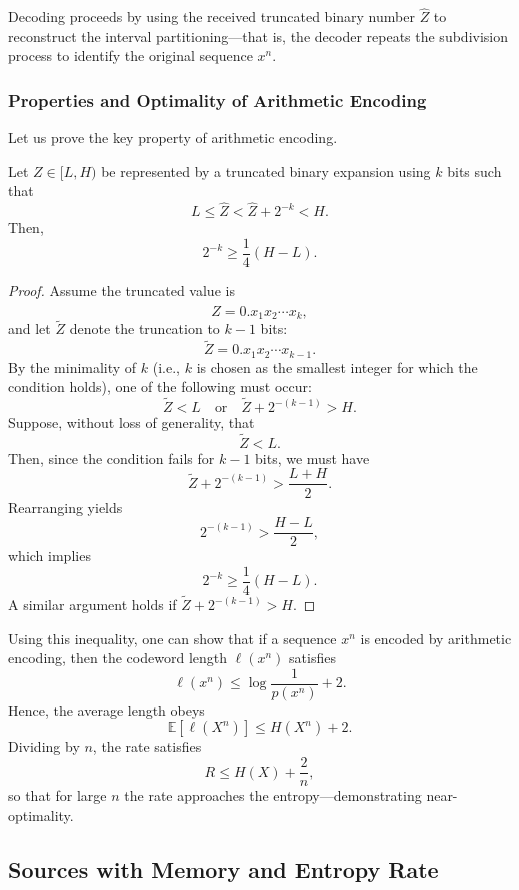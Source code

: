 Decoding proceeds by using the received truncated binary number \(\hat{Z}\) to reconstruct the interval partitioning—that is, the decoder repeats the subdivision process to identify the original sequence \(x^n\).

\subsubsection*{Properties and Optimality of Arithmetic Encoding}
Let us prove the key property of arithmetic encoding.

\begin{theorem}
Let \(Z \in [L,H)\) be represented by a truncated binary expansion using \(k\) bits such that
\[
L \le \hat{Z} < \hat{Z} + 2^{-k} < H.
\]
Then,
\[
2^{-k} \ge \frac{1}{4}(H-L).
\]
\end{theorem}
\begin{proof}
Assume the truncated value is 
\[
\hat{Z} = 0.x_1x_2\cdots x_k,
\]
and let \(\tilde{Z}\) denote the truncation to \(k-1\) bits:
\[
\tilde{Z} = 0.x_1x_2\cdots x_{k-1}.
\]
By the minimality of \(k\) (i.e., \(k\) is chosen as the smallest integer for which the condition holds), one of the following must occur:
\[
\tilde{Z} < L \quad \text{or} \quad \tilde{Z} + 2^{-(k-1)} > H.
\]
Suppose, without loss of generality, that
\[
\tilde{Z} < L.
\]
Then, since the condition fails for \(k-1\) bits, we must have 
\[
\tilde{Z} + 2^{-(k-1)} > \frac{L+H}{2}.
\]
Rearranging yields
\[
2^{-(k-1)} > \frac{H-L}{2},
\]
which implies
\[
2^{-k} \ge \frac{1}{4}(H-L).
\]
A similar argument holds if \(\tilde{Z} + 2^{-(k-1)} > H\).
\end{proof}

Using this inequality, one can show that if a sequence \(x^n\) is encoded by arithmetic encoding, then the codeword length \(\ell(x^n)\) satisfies
\[
\ell(x^n) \le \log \frac{1}{p(x^n)} + 2.
\]
Hence, the average length obeys
\[
\mathbb{E}[\ell(X^n)] \le H(X^n) + 2.
\]
Dividing by \(n\), the rate satisfies
\[
R \le H(X) + \frac{2}{n},
\]
so that for large \(n\) the rate approaches the entropy—demonstrating near-optimality.










\subsection{Sources with Memory and Entropy Rate} \label{sec:entropy-rate}
